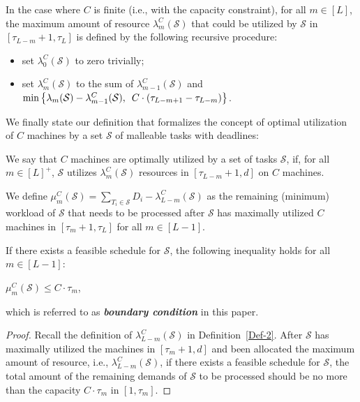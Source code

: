 \documentclass[10pt,journal,compsoc]{IEEEtran}
\begin{document}
\begin{definition}\label{Def-2}
In the case where $C$ is finite (i.e., with the capacity constraint), for all $m\in[L]$, the maximum amount of resource $\lambda_{m}^{C}(\mathcal{S})$ that could be utilized by $\mathcal{S}$ in $[\tau_{L-m}+1, \tau_{L}]$ is defined by the following recursive procedure:
\begin{itemize}
  \setlength\itemsep{0.3em}
\item set $\lambda_{0}^{C}(\mathcal{S})$ to zero trivially;
\item set $\lambda_{m}^{C}(\mathcal{S})$ to the sum of $\lambda_{m-1}^{C}(\mathcal{S})$ and \\
$\min\left\{\lambda_{m}(\mathcal{S})-\lambda_{m-1}^{C}(\mathcal{S}),\enskip C\cdot\left(\tau_{L-m+1}-\tau_{L-m}\right) \right\}$.
\end{itemize}
\end{definition}











We finally state our definition that formalizes the concept of optimal utilization of $C$ machines by a set $\mathcal{S}$ of malleable tasks with deadlines:


\begin{definition}\label{Def-3}
We say that $C$ machines are optimally utilized by a set of tasks $\mathcal{S}$, if, for all $m\in[L]^{+}$, $\mathcal{S}$ utilizes $\lambda_{m}^{C}(\mathcal{S})$ resources in $[\tau_{L-m}+1, d]$ on $C$ machines.
\end{definition}


We define $\mu_{m}^{C}(\mathcal{S})=\sum_{T_{i}\in\mathcal{S}}{D_{i}}-\lambda_{L-m}^{C}(\mathcal{S})$ as the remaining (minimum) workload of $\mathcal{S}$ that needs to be processed after $\mathcal{S}$ has maximally utilized $C$ machines in $[\tau_{m}+1, \tau_{L}]$ for all $m\in [L-1]$.



\begin{lemma}\label{boundary-condition}
If there exists a feasible schedule for $\mathcal{S}$,  the following inequality holds for all $m\in[L-1]$:
\begin{center}
$\mu_{m}^{C}(\mathcal{S})\leq C\cdot\tau_{m}$,
\end{center}
which is referred to as \textbf{{\em boundary condition}} in this paper.
\end{lemma}
\begin{proof}Recall the definition of $\lambda_{L-m}^{C}(\mathcal{S})$ in Definition~\ref{Def-2}. After $\mathcal{S}$ has maximally utilized the machines in $[\tau_{m}+1, d]$ and been allocated the maximum amount of resource, i.e., $\lambda_{L-m}^{C}(\mathcal{S})$, if there exists a feasible schedule for $\mathcal{S}$, the total amount of the remaining demands of $\mathcal{S}$ to be processed should be no more than the capacity $C\cdot\tau_{m}$ in $[1, \tau_{m}]$.
\end{proof}
\end{document}
